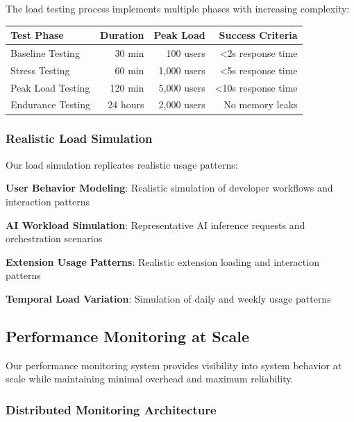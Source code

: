 The load testing process implements multiple phases with increasing complexity:

\begin{center}
\begin{tabular}{@{}lrrr@{}}
\toprule
\textbf{Test Phase} & \textbf{Duration} & \textbf{Peak Load} & \textbf{Success Criteria} \\
\midrule
Baseline Testing & 30 min & 100 users & <2s response time \\
Stress Testing & 60 min & 1,000 users & <5s response time \\
Peak Load Testing & 120 min & 5,000 users & <10s response time \\
Endurance Testing & 24 hours & 2,000 users & No memory leaks \\
\bottomrule
\end{tabular}
\end{center}

\subsubsection*{Realistic Load Simulation}

Our load simulation replicates realistic usage patterns:

\begin{compactlist}
    \item \textbf{User Behavior Modeling}: Realistic simulation of developer workflows and interaction patterns
    \item \textbf{AI Workload Simulation}: Representative AI inference requests and orchestration scenarios
    \item \textbf{Extension Usage Patterns}: Realistic extension loading and interaction patterns
    \item \textbf{Temporal Load Variation}: Simulation of daily and weekly usage patterns
\end{compactlist}

\subsection*{Performance Monitoring at Scale}

Our performance monitoring system provides visibility into system behavior at scale while maintaining minimal overhead and maximum reliability.

\subsubsection*{Distributed Monitoring Architecture}


